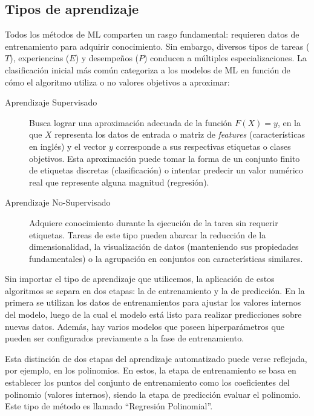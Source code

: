 \subsection{Tipos de aprendizaje}

Todos los métodos de \gls{ML} comparten un rasgo fundamental: requieren datos de entrenamiento para adquirir conocimiento. Sin embargo, diversos tipos de tareas ($T$), experiencias ($E$) y desempeños ($P$) conducen a múltiples especializaciones. La clasificación inicial más común categoriza a los modelos de \gls{ML} en función de cómo el algoritmo utiliza o no valores objetivos a aproximar:

\begin{description}
    \item[Aprendizaje Supervisado] Busca lograr una aproximación adecuada de la función $F(X) = y$, en la que $X$ representa los datos de entrada o matriz de \textit{features} (características en inglés) y el vector $y$ corresponde a sus respectivas etiquetas o clases objetivos. Esta aproximación puede tomar la forma de un conjunto finito de etiquetas discretas (clasificación) o intentar predecir un valor numérico real que represente alguna magnitud (regresión).

    \item[Aprendizaje No-Supervisado] Adquiere conocimiento durante la ejecución de la tarea sin requerir etiquetas. Tareas de este tipo pueden abarcar la reducción de la dimensionalidad, la visualización de datos (manteniendo sus propiedades fundamentales) o la agrupación en conjuntos con características similares.
\end{description}

Sin importar el tipo de aprendizaje que utilicemos, la aplicación de estos algoritmos se separa en dos etapas: la de entrenamiento y la de predicción. En la primera se utilizan los datos de entrenamientos para ajustar los valores internos del modelo, luego de la cual  el modelo está listo para realizar predicciones sobre nuevas datos. Además, hay varios modelos que poseen hiperparámetros que pueden ser configurados previamente a la fase de entrenamiento.

Esta distinción de dos etapas del aprendizaje automatizado puede verse reflejada, por ejemplo, en los polinomios. En estos, la etapa de entrenamiento se basa en establecer los puntos del conjunto de entrenamiento como los coeficientes del polinomio (valores internos), siendo la etapa de predicción evaluar el polinomio. Este tipo de método es llamado ``Regresión Polinomial''.

